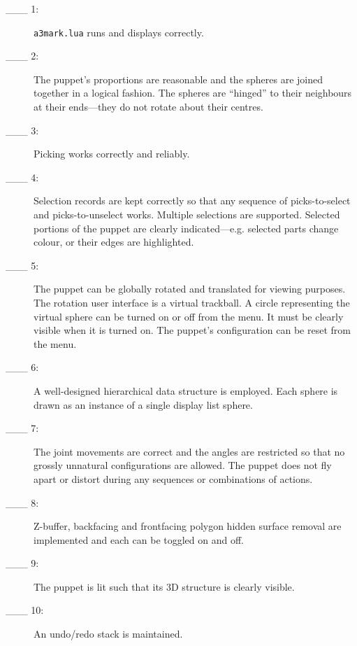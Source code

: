 \begin{description}
\item[\_\_\_ 1:]
        {\tt a3mark.lua} runs and displays correctly.
\item[\_\_\_ 2:]
	The puppet's proportions are reasonable
	and the spheres are joined together in a logical fashion.
	The spheres are ``hinged'' to their neighbours
	at their ends---they do not rotate about their centres.
\item[\_\_\_ 3:]
	Picking works correctly and reliably.
\item[\_\_\_ 4:]
	Selection records are kept correctly so that
	any sequence of picks-to-select and picks-to-unselect
	works.   Multiple selections are supported.
	Selected portions of the puppet are clearly 
	indicated---e.g. selected parts change colour, or their edges 
	are highlighted.
\item[\_\_\_ 5:]
	The puppet can be globally rotated and translated for viewing purposes.
	The rotation user interface is a virtual trackball.
	A circle representing the virtual sphere can be turned on or off from
	the menu. It must be clearly visible when it is turned on.
	The puppet's configuration can be reset from the menu.
\item[\_\_\_ 6:]
        A well-designed hierarchical data structure is employed.
	Each sphere is drawn as an instance of a single display
	list sphere.
\item[\_\_\_ 7:]
	The joint movements are correct and the angles are restricted
	so that no grossly unnatural configurations are allowed.
	The puppet does not fly apart or distort during any sequences
	or combinations of actions.
\item[\_\_\_ 8:]
	Z-buffer, backfacing and frontfacing polygon hidden surface 
	removal are implemented and each can be toggled on and off.
\item[\_\_\_ 9:]
	The puppet is lit such that its 3D structure is clearly
	visible.  
\item[\_\_\_ 10:]
	An undo/redo stack is maintained.
\end{description}



